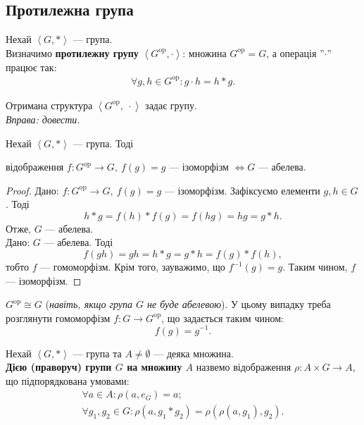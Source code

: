 \documentclass{math_library}
\begin{document}
\subsection{Протилежна група}
\begin{definition}
Нехай $\left<G,*\right>$ --- група.\\
Визначимо \textbf{протилежну групу} $\left< G^{\text{op}}, \cdot \right>$: множина $G^{\text{op}} = G$, а операція ''$\cdot$'' працює так:
\begin{align*}
\forall g,h \in G^{\text{op}}: g \cdot h = h*g.
\end{align*}
\end{definition}

\begin{proposition}
Отримана структура $\left< G^{\text{op}},\ \cdot \right>$ задає групу.\\
\textit{Вправа: довести.}
\end{proposition}

\begin{proposition}
Нехай $\left<G,*\right>$ --- група. Тоді
\begin{center}
відображення $f \colon G^{\text{op}} \to G,\ f(g) = g$ --- ізоморфізм $\iff G$ --- абелева.
\end{center}
\end{proposition}

\begin{proof}
\rightproof Дано: $f \colon G^{\text{op}} \to G,\ f(g) = g$ --- ізоморфізм. Зафіксуємо елементи $g,h \in G$. Тоді 
\[
h*g = f(h)*f(g) = f(hg) = hg = g*h.
\] 
Отже, $G$ --- абелева.
\bigskip \\
\leftproof Дано: $G$ --- абелева. Тоді 
\[
f(gh) = gh = h*g = g*h = f(g)*f(h),
\] тобто $f$ --- гомоморфізм. Крім того, зауважимо, що $f^{-1}(g) = g$. Таким чином, $f$ --- ізоморфізм. 
\end{proof}

\begin{remark}
$G^{\text{op}} \cong G$ (\textit{навіть, якщо група $G$ не буде абелевою}). У цьому випадку треба розглянути гомоморфізм $f \colon G \to G^{\text{op}}$, що задається таким чином: 
\[
f(g) = g^{-1}.
\]
\end{remark}

\begin{definition}
Нехай $\left<G,*\right>$ --- група та $A \neq \emptyset$ --- деяка множина.\\
\textbf{Дією (праворуч) групи $G$ на множину $A$} назвемо відображення $\rho \colon A \times G \to A$, що підпорядкована умовами:
\begin{align*}
\forall a \in A: \rho(a,e_G) = a; \\
\forall g_1,g_2 \in G: \rho(a,g_1*g_2) = \rho(\rho(a,g_1),g_2).
\end{align*}
\end{definition}
\end{document}
